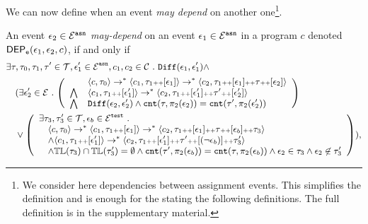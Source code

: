 We can now define when an event \emph{may depend} on another one\footnote{We consider here dependencies between assignment events. This simplifies the definition and is enough for the stating the following definitions. The full definition is in the supplementary material.}.
\begin{defn}
\label{def:event_dep}
An event $\mathtt{\epsilon}_2\in \mathcal{E}^{\mathtt{{asn}}}$ \emph{may-depend} on an event $\mathtt{\epsilon}_1 \in \mathcal{E}^{\mathtt{{asn}}}$ in a program ${c}$ denoted
$\mathsf{DEP_{\mathtt{e}}}(\mathtt{\epsilon}_1, \mathtt{\epsilon}_2, c)$, if and only if
\begin{subequations}
{\small 
\begin{align}
&  
\exists \trace, \trace_0, \trace_1, \trace' \in \mathcal{T},\event_1' \in \eventset^{\asn}, {c}_1, {c}_2  \in \cdom  \st \diff(\event_1, \event_1') \land \\
& 
\quad (\exists  \event_2' \in \eventset \st 
\left(
\begin{array}{ll}   
  & \config{{c}, \trace_0} \rightarrow^{*} 
  \config{{c}_1, \trace_1 \tracecat [\event_1]}  \rightarrow^{*} 
  \config{{c}_2,  \trace_1 \tracecat [\event_1] \tracecat \trace \tracecat [\event_2] } 
   \\ 
   \bigwedge &
   \config{{c}_1, \trace_1 \tracecat [\event_1']}  \rightarrow^{*}
    \config{{c}_2,  \trace_1 \tracecat[ \event_1'] \tracecat \trace' \tracecat [\event_2'] } 
  \\
  \bigwedge & 
  \diff(\event_2,\event_2' ) \land 
  \vcounter(\trace, \pi_2(\event_2))
  = 
  \vcounter(\trace', \pi_2(\event_2'))\\
  \end{array}
  \right)\\ 
  & 
  \quad
  \lor 
  \left(
  \begin{array}{l} 
  \exists \trace_3, \trace_3'  \in \mathcal{T}, \event_b \in \eventset^{\test} \st 
  \\
   \quad \config{{c}, \trace_0} \rightarrow^{*} \config{{c}_1, \trace_1 \tracecat [\event_1]}  \rightarrow^{*}
   \config{c_2,  \trace_1 \tracecat [\event_1] \tracecat
   \trace \tracecat [\event_b] \tracecat  \trace_3} 
\\ \quad \land
\config{{c}_1, \trace_1 \tracecat [\event_1']}  \rightarrow^{*} 
\config{c_2,  \trace_1 \tracecat [\event_1'] \tracecat \trace' \tracecat [(\neg \event_b)] \tracecat \trace_3'} 
\\
\quad \land \tlabel({\trace_3}) \cap \tlabel({\trace_3'})
= \emptyset
\land \vcounter(\trace', \pi_2(\event_b)) = \vcounter(\trace, \pi_2(\event_b)) 
    \land \event_2 \in \trace_3
    \land \event_2 \not\in \trace_3'
  \end{array}
  \right)
  ),
\end{align}
}
\label{eq:eventdep}
\end{subequations}
\end{defn}
